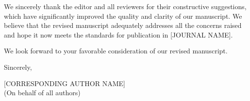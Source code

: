 \documentclass[12pt]{article}
\begin{document}

% 


\bigskip

We sincerely thank the editor and all reviewers for their constructive suggestions, which have significantly improved the quality and clarity of our manuscript. We believe that the revised manuscript adequately addresses all the concerns raised and hope it now meets the standards for publication in [JOURNAL NAME].

We look forward to your favorable consideration of our revised manuscript.

\bigskip

Sincerely,

\bigskip

[CORRESPONDING AUTHOR NAME] \\
(On behalf of all authors)
\end{document}
